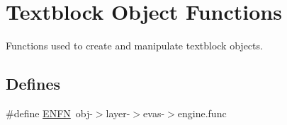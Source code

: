 \section{Textblock Object Functions}
\label{group__Evas__Object__Textblock}


Functions used to create and manipulate textblock objects.  


\subsection*{Defines}
\begin{DoxyCompactItemize}
\item 
\#define \hyperlink{group__Evas__Object__Textblock_gac8ab2a94f6b027a2b24fffdd23b113fb}{ENFN}~obj-\/$>$layer-\/$>$evas-\/$>$engine.func
\end{DoxyCompactItemize}
